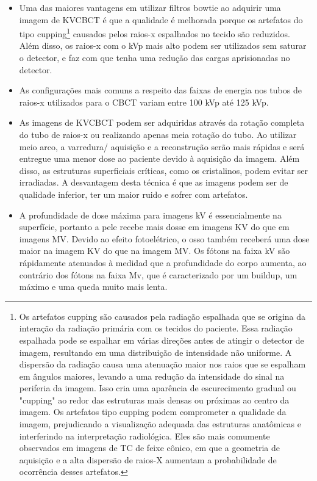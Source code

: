 \documentclass[11pt,a4paper]{article}
\newcounter{exemplo}
\begin{document}
\begin{exemplo}[12. IGRT ]
\begin{itemize}
        \item Uma das maiores vantagens em utilizar filtros bowtie ao adquirir uma imagem de KVCBCT é que a qualidade é melhorada porque os artefatos do tipo cupping\footnote{Os artefatos cupping são causados pela radiação espalhada que se origina da interação da radiação primária com os tecidos do paciente. Essa radiação espalhada pode se espalhar em várias direções antes de atingir o detector de imagem, resultando em uma distribuição de intensidade não uniforme. A dispersão da radiação causa uma atenuação maior nos raios que se espalham em ângulos maiores, levando a uma redução da intensidade do sinal na periferia da imagem. Isso cria uma aparência de escurecimento gradual ou "cupping" ao redor das estruturas mais densas ou próximas ao centro da imagem. Os artefatos tipo cupping podem comprometer a qualidade da imagem, prejudicando a visualização adequada das estruturas anatômicas e interferindo na interpretação radiológica. Eles são mais comumente observados em imagens de TC de feixe cônico, em que a geometria de aquisição e a alta dispersão de raios-X aumentam a probabilidade de ocorrência desses artefatos.} causados pelos raios-x espalhados no tecido são reduzidos. Além disso, os raios-x com o kVp mais alto podem ser utilizados sem saturar o detector, e faz com que tenha uma redução das cargas aprisionadas no detector.
        
        \item As configurações mais comuns a respeito das faixas de energia nos tubos de raios-x utilizados para o CBCT variam entre 100 kVp até 125 kVp.
        
        \item As imagens de KVCBCT podem ser adquiridas através da rotação completa do tubo de raios-x ou realizando apenas meia rotação do tubo. Ao utilizar meio arco, a varredura/ aquisição e a reconstrução serão mais rápidas e será entregue uma menor dose ao paciente devido à aquisição da imagem. Além disso, as estruturas superficiais críticas, como os cristalinos, podem evitar ser irradiadas. A desvantagem desta técnica é que as imagens podem ser de qualidade inferior, ter um maior ruido e sofrer com artefatos.
        
        \item A profundidade de dose máxima para imagens kV é essencialmente na superfície, portanto a pele recebe mais dosse em imagens KV do que em imagens MV. Devido ao efeito fotoelétrico, o osso também receberá uma dose maior na imagem KV do que na imagem MV. Os fótons na faixa kV são rápidamente atenuados à medidad que a profundidade do corpo aumenta, ao contrário dos fótons na faixa Mv, que é caracterizado por um buildup, um máximo e uma queda muito mais lenta. 
        

\end{itemize}
\end{exemplo}
\end{document}

